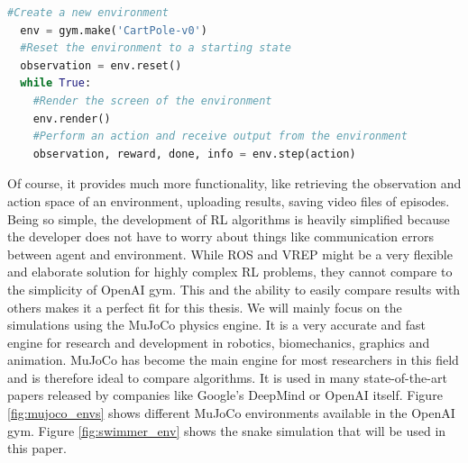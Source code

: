 \begin{lstlisting}[language=Python, caption=Example of the basic OpenAI Gym API, captionpos=b, label=lst:openai_gym-api]
  #Create a new environment
  env = gym.make('CartPole-v0')
  #Reset the environment to a starting state
  observation = env.reset()
  while True:
    #Render the screen of the environment
    env.render()
    #Perform an action and receive output from the environment
    observation, reward, done, info = env.step(action)
\end{lstlisting}

Of course, it provides much more functionality, like retrieving the observation and action space of an environment, uploading results, saving video files of episodes.
Being so simple, the development of RL algorithms is heavily simplified because the developer does not have to worry about things like communication errors between agent and environment.
While ROS and VREP might be a very flexible and elaborate solution for highly complex RL problems, they cannot compare to the simplicity of OpenAI gym.
This and the ability to easily compare results with others makes it a perfect fit for this thesis.
We will mainly focus on the simulations using the MuJoCo physics engine.
It is a very accurate and fast engine for research and development in robotics, biomechanics, graphics and animation.
MuJoCo has become the main engine for most researchers in this field and is therefore ideal to compare algorithms.
It is used in many state-of-the-art papers released by companies like Google's DeepMind or OpenAI itself.
Figure \ref{fig:mujoco_envs} shows different MuJoCo environments available in the OpenAI gym.
Figure \ref{fig:swimmer_env} shows the snake simulation that will be used in this paper.


